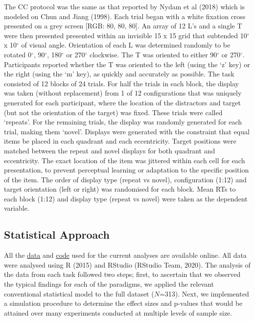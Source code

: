 \documentclass[
  man]{apa6}
\begin{document}
The CC protocol was the same as that reported by Nydam et al (2018) which is modeled on Chun and Jiang (1998). Each trial began with a white fixation cross presented on a grey screen {[}RGB: 80, 80, 80{]}. An array of 12 L's and a single T were then presented presented within an invisible 15 x 15 grid that subtended 10\(^\circ\) x 10\(^\circ\) of visual angle. Orientation of each L was determined randomly to be rotated 0\(^\circ\), 90\(^\circ\), 180\(^\circ\) or 270\(^\circ\) clockwise. The T was oriented to either 90\(^\circ\) or 270\(^\circ\). Participants reported whether the T was oriented to the left (using the `z' key) or the right (using the `m' key), as quickly and accurately as possible. The task consisted of 12 blocks of 24 trials. For half the trials in each block, the display was taken (without replacement) from 1 of 12 configurations that was uniquely generated for each participant, where the location of the distractors and target (but not the orientation of the target) was fixed. These trials were called `repeats'. For the remaining trials, the display was randomly generated for each trial, making them `novel'. Displays were generated with the constraint that equal items be placed in each quadrant and each eccentricity. Target positions were matched between the repeat and novel displays for both quadrant and eccentricity. The exact location of the item was jittered within each cell for each presentation, to prevent perceptual learning or adaptation to the specific position of the item. The order of display type (repeat vs novel), configuration (1:12) and target orientation (left or right) was randomised for each block. Mean RTs to each block (1:12) and display type (repeat vs novel) were taken as the dependent variable.

\hypertarget{statistical-approach}{%
\subsection{Statistical Approach}\label{statistical-approach}}

All the \href{https://doi.org/10.48610/b63ecc2}{data} and \href{https://github.com/kel-github/Super-Effects}{code} used for the current analyses are available online. All data were analysed using R (2015) and RStudio (RStudio Team, 2020). The analysis of the data from each task followed two steps; first, to ascertain that we observed the typical findings for each of the paradigms, we applied the relevant conventional statistical model to the full dataset (\(N\)=313). Next, we implemented a simulation procedure to determine the effect sizes and p-values that would be attained over many experiments conducted at multiple levels of sample size.
\end{document}
